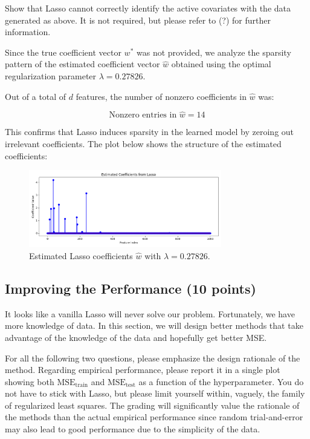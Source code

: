 \documentclass{article}
\begin{document}
Show that Lasso cannot correctly identify the active covariates with the data generated as above. It is
not required, but please refer to (?) for further information.

Since the true coefficient vector \( w^* \) was not provided, we analyze the sparsity pattern of the estimated coefficient vector \( \hat{w} \) obtained using the optimal regularization parameter \( \lambda = 0.27826 \).

Out of a total of \( d \) features, the number of nonzero coefficients in \( \hat{w} \) was:

\[
\text{Nonzero entries in } \hat{w} = 14
\]

This confirms that Lasso induces sparsity in the learned model by zeroing out irrelevant coefficients. The plot below shows the structure of the estimated coefficients:

\begin{figure}[H]
    \centering
    \includegraphics[width=0.75\textwidth]{lasso_estimated_coefficients.png}
    \caption{Estimated Lasso coefficients \( \hat{w} \) with \( \lambda = 0.27826 \).}
\end{figure}




\subsection{Improving the Performance (10 points)}

It looks like a vanilla Lasso will never solve our problem. Fortunately, we have more knowledge of data. In
this section, we will design better methods that take advantage of the knowledge of the data and hopefully
get better MSE.

For all the following two questions, please emphasize the design rationale of the method. Regarding
empirical performance, please report it in a single plot showing both $\text{MSE}_{\text{train}}$ and $\text{MSE}_{\text{test}}$ as a function
of the hyperparameter. You do not have to stick with Lasso, but please limit yourself within, vaguely, the
family of regularized least squares. The grading will significantly value the rationale of the methods than
the actual empirical performance since random trial-and-error may also lead to good performance due to the
simplicity of the data.
\end{document}
